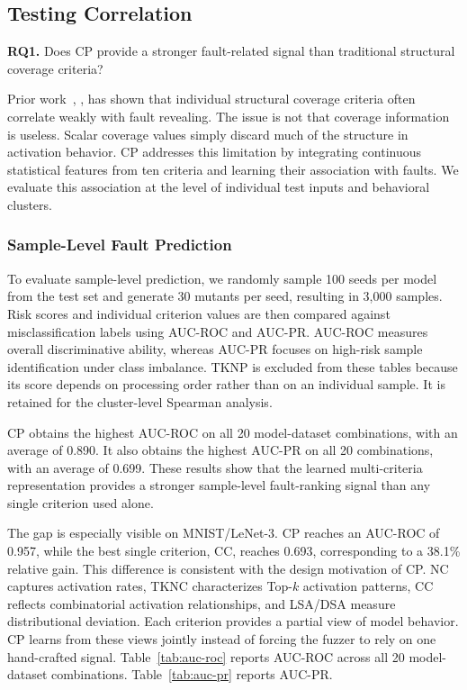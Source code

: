 \documentclass[preprint,number,5p,twocolumn]{elsarticle}
\begin{document}
\subsection{Testing Correlation}\label{sec:rq1}

\begin{rqbox}
\textbf{RQ1.} Does CP provide a stronger fault-related signal than traditional structural coverage criteria?
\end{rqbox}

Prior work~\cite{Harel-CanadaWGG20}, \cite{LiM0C19}, \cite{WangXFCLL24} has shown that individual structural coverage criteria often correlate weakly with fault revealing. The issue is not that coverage information is useless. Scalar coverage values simply discard much of the structure in activation behavior. CP addresses this limitation by integrating continuous statistical features from ten criteria and learning their association with faults. We evaluate this association at the level of individual test inputs and behavioral clusters.

\subsubsection{Sample-Level Fault Prediction}

To evaluate sample-level prediction, we randomly sample 100 seeds per model from the test set and generate 30 mutants per seed, resulting in 3,000 samples. Risk scores and individual criterion values are then compared against misclassification labels using AUC-ROC and AUC-PR. AUC-ROC measures overall discriminative ability, whereas AUC-PR focuses on high-risk sample identification under class imbalance. TKNP is excluded from these tables because its score depends on processing order rather than on an individual sample. It is retained for the cluster-level Spearman analysis.

CP obtains the highest AUC-ROC on all 20 model-dataset combinations, with an average of 0.890. It also obtains the highest AUC-PR on all 20 combinations, with an average of 0.699. These results show that the learned multi-criteria representation provides a stronger sample-level fault-ranking signal than any single criterion used alone.

The gap is especially visible on MNIST/LeNet-3. CP reaches an AUC-ROC of 0.957, while the best single criterion, CC, reaches 0.693, corresponding to a 38.1\% relative gain. This difference is consistent with the design motivation of CP. NC captures activation rates, TKNC characterizes Top-$k$ activation patterns, CC reflects combinatorial activation relationships, and LSA/DSA measure distributional deviation. Each criterion provides a partial view of model behavior. CP learns from these views jointly instead of forcing the fuzzer to rely on one hand-crafted signal. Table~\ref{tab:auc-roc} reports AUC-ROC across all 20 model-dataset combinations. Table~\ref{tab:auc-pr} reports AUC-PR.
\end{document}

